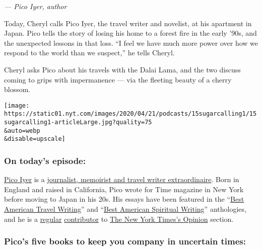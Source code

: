 \emph{--- Pico Iyer, author}

Today, Cheryl calls Pico Iyer, the travel writer and novelist, at his
apartment in Japan. Pico tells the story of losing his home to a forest
fire in the early '90s, and the unexpected lessons in that loss. ``I
feel we have much more power over how we respond to the world than we
suspect,'' he tells Cheryl.

Cheryl asks Pico about his travels with the Dalai Lama, and the two
discuss coming to grips with impermanence --- via the fleeting beauty of
a cherry blossom.

\texttt{[image: https://static01.nyt.com/images/2020/04/21/podcasts/15sugarcalling1/15sugarcalling1-articleLarge.jpg?quality=75\\\&auto=webp\\\&disable=upscale]}

\hypertarget{on-todays-episode}{%
\subsubsection{\texorpdfstring{\textbf{On today's
episode:}}{On today's episode:}}\label{on-todays-episode}}

\href{https://picoiyerjourneys.com/}{Pico Iyer} is a
\href{https://www.nytimes.com/2019/04/22/books/review/pico-iyer-autumn-light-memoir-japan.html}{journalist,
memoirist and travel writer extraordinaire}. Born in England and raised
in California, Pico wrote for Time magazine in New York before moving to
Japan in his 20s. His essays have been featured in the
``\href{https://www.amazon.com/Best-American-Travel-Writing-2004/dp/0618341269}{Best
American Travel Writing}'' and
``\href{https://www.amazon.com/dp/B0036Q4M7W/ref=dp-kindle-redirect?_encoding=UTF8\&btkr=1}{Best
American Spiritual Writing}'' anthologies, and he is a
\href{https://www.nytimes.com/2019/09/20/opinion/aging-marriage-autumn.html}{regular}
\href{https://www.nytimes.com/2012/01/01/opinion/sunday/the-joy-of-quiet.html}{contributor}
to
\href{https://www.nytimes.com/2016/12/31/opinion/sunday/what-do-we-know.html}{The
New York Times's Opinion} section.

\hypertarget{picos-five-books-to-keep-you-company-in-uncertain-times}{%
\subsubsection{\texorpdfstring{\textbf{Pico's five books to keep you
company in uncertain
times:}}{Pico's five books to keep you company in uncertain times:}}\label{picos-five-books-to-keep-you-company-in-uncertain-times}}

